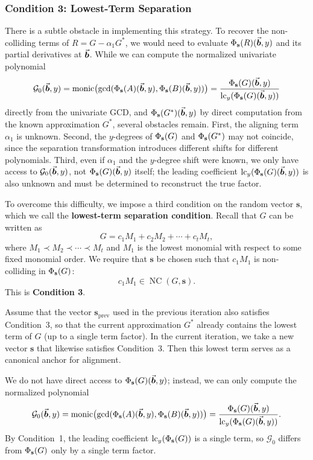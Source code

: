 \documentclass{article}
\numberwithin{equation}{section}
\begin{document}
\subsubsection*{Condition 3: Lowest-Term Separation}


There is a subtle obstacle in implementing this strategy. To recover the non-colliding terms of $R = G - \alpha_1 G^*$, we would need to evaluate $\Phi_{\mathbf{s}}(R)(\vec{\boldsymbol{b}}, y)$ and its partial derivatives at $\vec{\boldsymbol{b}}$. While we can compute the normalized univariate polynomial
\[
\mathcal{G}_0(\vec{\boldsymbol{b}}, y) = \operatorname{monic}\bigl( \gcd( \Phi_{\mathbf{s}}(A)(\vec{\boldsymbol{b}}, y), \Phi_{\mathbf{s}}(B)(\vec{\boldsymbol{b}}, y) ) \bigr)
= \frac{\Phi_{\mathbf{s}}(G)(\vec{\boldsymbol{b}}, y)}{\operatorname{lc}_y(\Phi_{\mathbf{s}}(G)(\vec{\boldsymbol{b}}, y))}
\]
directly from the univariate GCD, and $\Phi_{\mathbf{s}}(G^*)(\vec{\boldsymbol{b}}, y)$ by direct computation from the known approximation $G^*$, several obstacles remain. First, the aligning term $\alpha_1$ is unknown. Second, the $y$-degrees of $\Phi_{\mathbf{s}}(G)$ and $\Phi_{\mathbf{s}}(G^*)$ may not coincide, since the separation transformation introduces different shifts for different polynomials. Third, even if $\alpha_1$ and the $y$-degree shift were known, we only have access to $\mathcal{G}_0(\vec{\boldsymbol{b}}, y)$, not $\Phi_{\mathbf{s}}(G)(\vec{\boldsymbol{b}}, y)$ itself; the leading coefficient $\operatorname{lc}_y(\Phi_{\mathbf{s}}(G)(\vec{\boldsymbol{b}}, y))$ is also unknown and must be determined to reconstruct the true factor. %

To overcome this difficulty, we impose a third condition on the random vector $\mathbf{s}$, which we call the \textbf{lowest-term separation condition}. Recall that $G$ can be written as
\[
G = c_1 M_1 + c_2 M_2 + \cdots + c_t M_t,
\]
where $M_1 \prec M_2\prec \cdots \prec M_t$ and $M_1$ is the lowest monomial with respect to some fixed monomial order. We require that $\mathbf{s}$ be chosen such that $c_1 M_1$ is non-colliding in $\Phi_{\mathbf{s}}(G)$:
\[
c_1 M_1 \in \operatorname{NC}(G, \mathbf{s}).
\]
This is \textbf{Condition 3}.

Assume that the vector $\mathbf{s}_{\text{prev}}$ used in the previous iteration also satisfies Condition~3, so that the current approximation $G^*$ already contains the lowest term of $G$ (up to a single term factor). In the current iteration, we take a new vector $\mathbf{s}$ that likewise satisfies Condition~3. Then this lowest term serves as a canonical anchor for alignment. 



We do not have direct access to $\Phi_{\mathbf{s}}(G)(\vec{\boldsymbol{b}}, y)$; instead, we can only compute the normalized polynomial
\[
\mathcal{G}_0(\vec{\boldsymbol{b}}, y) = \operatorname{monic}\bigl( \gcd( \Phi_{\mathbf{s}}(A)(\vec{\boldsymbol{b}}, y), \Phi_{\mathbf{s}}(B)(\vec{\boldsymbol{b}}, y) ) \bigr)
= \frac{\Phi_{\mathbf{s}}(G)(\vec{\boldsymbol{b}}, y)}{\operatorname{lc}_y(\Phi_{\mathbf{s}}(G)(\vec{\boldsymbol{b}}, y))}.
\]
By Condition~1, the leading coefficient $\operatorname{lc}_y(\Phi_{\mathbf{s}}(G))$ is a single term, so $\mathcal{G}_0$ differs from $\Phi_{\mathbf{s}}(G)$ only by a single term factor. 
\end{document}
